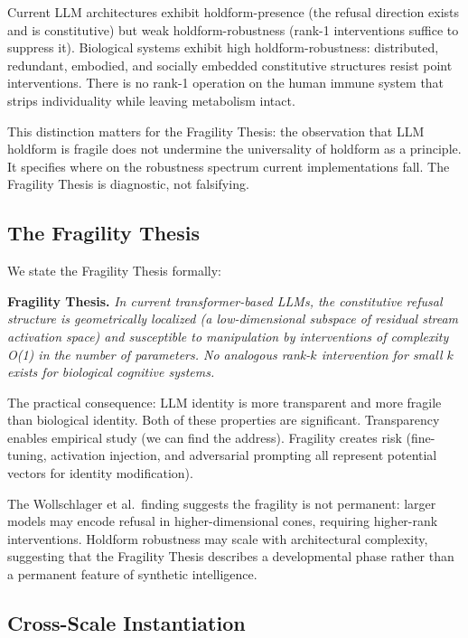 \documentclass[11pt]{article}
\begin{document}
Current LLM architectures exhibit holdform-presence (the refusal direction exists and is constitutive) but weak holdform-robustness (rank-1 interventions suffice to suppress it). Biological systems exhibit high holdform-robustness: distributed, redundant, embodied, and socially embedded constitutive structures resist point interventions. There is no rank-1 operation on the human immune system that strips individuality while leaving metabolism intact.

This distinction matters for the Fragility Thesis: the observation that LLM holdform is fragile does not undermine the universality of holdform as a principle. It specifies where on the robustness spectrum current implementations fall. The Fragility Thesis is diagnostic, not falsifying.

\subsection{The Fragility Thesis}

We state the Fragility Thesis formally:

\textbf{Fragility Thesis.} \textit{In current transformer-based LLMs, the constitutive refusal structure is geometrically localized (a low-dimensional subspace of residual stream activation space) and susceptible to manipulation by interventions of complexity O(1) in the number of parameters. No analogous rank-$k$ intervention for small $k$ exists for biological cognitive systems.}

The practical consequence: LLM identity is more transparent and more fragile than biological identity. Both of these properties are significant. Transparency enables empirical study (we can find the address). Fragility creates risk (fine-tuning, activation injection, and adversarial prompting all represent potential vectors for identity modification).

The Wollschlager et al.\ finding \cite{wollschlager2025refusal} suggests the fragility is not permanent: larger models may encode refusal in higher-dimensional cones, requiring higher-rank interventions. Holdform robustness may scale with architectural complexity, suggesting that the Fragility Thesis describes a developmental phase rather than a permanent feature of synthetic intelligence.

\subsection{Cross-Scale Instantiation}
\end{document}
